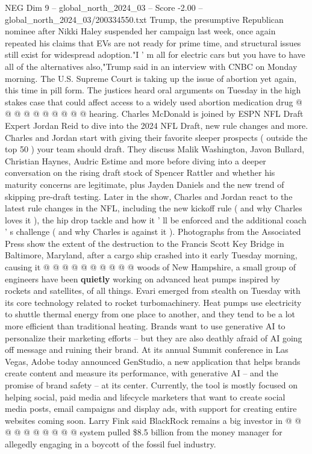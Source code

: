 \begin{textsample}{NEG Dim 9 – global\_north\_2024\_03 – Score -2.00 – global\_north\_2024\_03/200334550.txt}
Trump, the presumptive Republican nominee after Nikki Haley suspended her campaign last week, once again repeated his claims that EVs are not ready for prime time, and structural issues still exist for widespread adoption."I ' m all for electric cars but you have to have all of the alternatives also,"Trump said in an interview with CNBC on Monday morning.
The U.S.
Supreme Court is taking up the issue of abortion yet again, this time in pill form.
The justices heard oral arguments on Tuesday in the high stakes case that could affect access to a widely used abortion medication drug @ @ @ @ @ @ @ @ @ @ hearing.
Charles McDonald is joined by ESPN NFL Draft Expert Jordan Reid to dive into the 2024 NFL Draft, new rule changes and more.
Charles and Jordan start with giving their favorite sleeper prospects ( outside the top 50 ) your team should draft.
They discuss Malik Washington, Javon Bullard, Christian Haynes, Audric Estime and more before diving into a deeper conversation on the rising draft stock of Spencer Rattler and whether his maturity concerns are legitimate, plus Jayden Daniels and the new trend of skipping pre-draft testing.
Later in the show, Charles and Jordan react to the latest rule changes in the NFL, including the new kickoff rule ( and why Charles loves it ), the hip drop tackle and how it ' ll be enforced and the additional coach ' s challenge ( and why Charles is against it ).
Photographs from the Associated Press show the extent of the destruction to the Francis Scott Key Bridge in Baltimore, Maryland, after a cargo ship crashed into it early Tuesday morning, causing it @ @ @ @ @ @ @ @ @ @ woods of New Hampshire, a small group of engineers have been \textbf{quietly} working on advanced heat pumps inspired by rockets and satellites, of all things.
Evari emerged from stealth on Tuesday with its core technology related to rocket turbomachinery.
Heat pumps use electricity to shuttle thermal energy from one place to another, and they tend to be a lot more efficient than traditional heating.
Brands want to use generative AI to personalize their marketing efforts -- but they are also deathly afraid of AI going off message and ruining their brand.
At its annual Summit conference in Las Vegas, Adobe today announced GenStudio, a new application that helps brands create content and measure its performance, with generative AI -- and the promise of brand safety -- at its center.
Currently, the tool is mostly focused on helping social, paid media and lifecycle marketers that want to create social media posts, email campaigns and display ads, with support for creating entire websites coming soon.
Larry Fink said BlackRock remains a big investor in @ @ @ @ @ @ @ @ @ @ system pulled \$8.5 billion from the money manager for allegedly engaging in a boycott of the fossil fuel industry.

\end{textsample}
